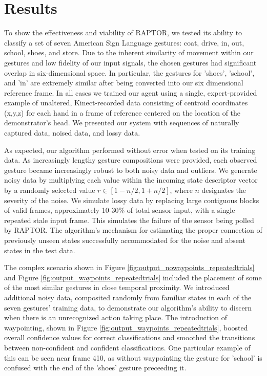 \documentclass[letterpaper]{article}
\begin{document}
\section{Results}
\label{sec:result}
To show the effectiveness and viability of RAPTOR, we tested its ability to classify a set of seven American Sign Language gestures: coat, drive, in, out, school, shoes, and store. Due to the inherent similarity of movement within our gestures and low fidelity of our input signals, the chosen gestures had significant overlap in six-dimensional space. In particular, the gestures for 'shoes', 'school', and 'in' are extremely similar after being converted into our six dimensional reference frame. In all cases we trained our agent using a single, expert-provided example of unaltered, Kinect-recorded data consisting of centroid coordinates (x,y,z) for each hand in a frame of reference centered on the location of the demonstrator's head. We presented our system with sequences of naturally captured data, noised data, and lossy data. 

As expected, our algorithm performed without error when tested on its training data. As increasingly lengthy gesture compositions were provided, each observed gesture became increasingly robust to both noisy data and outliers. We generate noisy data by multiplying each value within the incoming state descriptor vector by a randomly selected value $r \in [1 - n/2, 1 + n/2]$, where $n$ designates the severity of the noise. We simulate lossy data by replacing large contiguous blocks of valid frames, approximately 10-30\% of total sensor input, with a single repeated stale input frame. This simulates the failure of the sensor being polled by RAPTOR. The algorithm's mechanism for estimating the proper connection of previously unseen states successfully accommodated for the noise and absent states in the test data. 

The complex scenario shown in Figure \ref{fig:output_nowaypoints_repeatedtrials} and Figure \ref{fig:output_waypoints_repeatedtrials} included the placement of some of the most similar gestures in close temporal proximity. We introduced additional noisy data, composited randomly from familiar states in each of the seven gestures' training data, to demonstrate our algorithm's ability to discern when there is an unrecognized action taking place. The introduction of waypointing, shown in Figure \ref{fig:output_waypoints_repeatedtrials}, boosted overall confidence values for correct classifications and smoothed the transitions between non-confident and confident classifications. One particular example of this can be seen near frame 410, as without waypointing the gesture for 'school' is confused with the end of the 'shoes' gesture preceeding it. 
\end{document}
